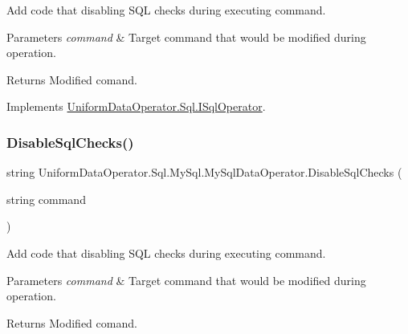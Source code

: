 Add code that disabling S\+QL checks during executing command. 


\begin{DoxyParams}{Parameters}
{\em command} & Target command that would be modified during operation.\\
\hline
\end{DoxyParams}
\begin{DoxyReturn}{Returns}
Modified comand.
\end{DoxyReturn}


Implements \mbox{\hyperlink{interface_uniform_data_operator_1_1_sql_1_1_i_sql_operator_a12d464e0532a3e194b1221eee0c32d34}{Uniform\+Data\+Operator.\+Sql.\+I\+Sql\+Operator}}.

\mbox{\label{class_uniform_data_operator_1_1_sql_1_1_my_sql_1_1_my_sql_data_operator_a3e80f9136c9fef46a443901a15f1e289}} 
\subsubsection{\texorpdfstring{Disable\+Sql\+Checks()}{DisableSqlChecks()}\hspace{0.1cm}{\footnotesize\ttfamily [2/2]}}
{\footnotesize\ttfamily string Uniform\+Data\+Operator.\+Sql.\+My\+Sql.\+My\+Sql\+Data\+Operator.\+Disable\+Sql\+Checks (\begin{DoxyParamCaption}\item[{string}]{command }\end{DoxyParamCaption})}



Add code that disabling S\+QL checks during executing command. 


\begin{DoxyParams}{Parameters}
{\em command} & Target command that would be modified during operation.\\
\hline
\end{DoxyParams}
\begin{DoxyReturn}{Returns}
Modified comand.
\end{DoxyReturn}


